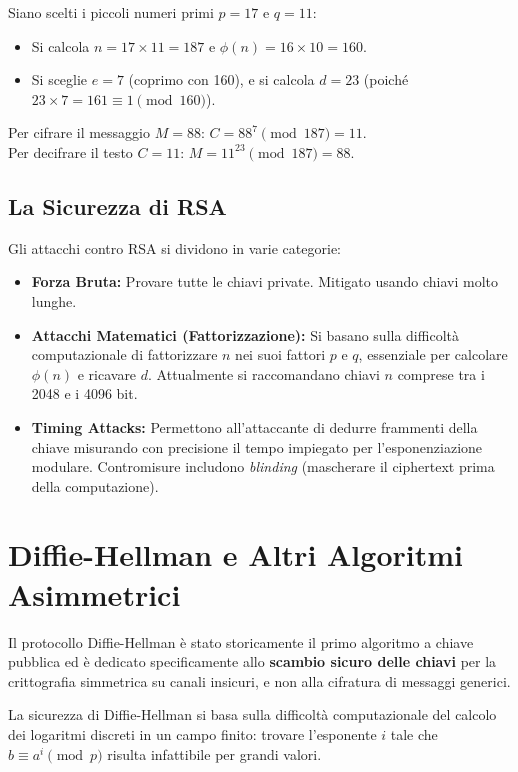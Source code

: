 \begin{exbox}
Siano scelti i piccoli numeri primi $p=17$ e $q=11$:
\begin{itemize}
    \item Si calcola $n = 17 \times 11 = 187$ e $\phi(n) = 16 \times 10 = 160$.
    \item Si sceglie $e=7$ (coprimo con 160), e si calcola $d=23$ (poiché $23 \times 7 = 161 \equiv 1 \pmod{160}$).
\end{itemize}
Per cifrare il messaggio $M=88$: $C = 88^7 \pmod{187} = 11$.\\
Per decifrare il testo $C=11$: $M = 11^{23} \pmod{187} = 88$.
\end{exbox}

\subsection{La Sicurezza di RSA}
Gli attacchi contro RSA si dividono in varie categorie:
\begin{itemize}
    \item \textbf{Forza Bruta:} Provare tutte le chiavi private. Mitigato usando chiavi molto lunghe.
    \item \textbf{Attacchi Matematici (Fattorizzazione):} Si basano sulla difficoltà computazionale di fattorizzare $n$ nei suoi fattori $p$ e $q$, essenziale per calcolare $\phi(n)$ e ricavare $d$. Attualmente si raccomandano chiavi $n$ comprese tra i 2048 e i 4096 bit.
    \item \textbf{Timing Attacks:} Permettono all'attaccante di dedurre frammenti della chiave misurando con precisione il tempo impiegato per l'esponenziazione modulare. Contromisure includono \textit{blinding} (mascherare il ciphertext prima della computazione).
\end{itemize}

\section{Diffie-Hellman e Altri Algoritmi Asimmetrici}

Il protocollo Diffie-Hellman è stato storicamente il primo algoritmo a chiave pubblica ed è dedicato specificamente allo \textbf{scambio sicuro delle chiavi} per la crittografia simmetrica su canali insicuri, e non alla cifratura di messaggi generici.

\begin{notebox}
La sicurezza di Diffie-Hellman si basa sulla difficoltà computazionale del calcolo dei logaritmi discreti in un campo finito: trovare l'esponente $i$ tale che $b \equiv a^i \pmod{p}$ risulta infattibile per grandi valori.
\end{notebox}

